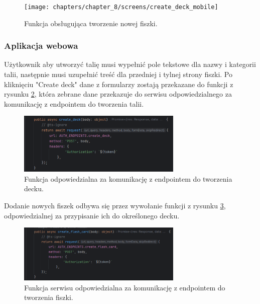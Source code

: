 \begin{figure}[H]
    \centering
    \texttt{[image: chapters/chapter\_8/screens/create\_deck\_mobile]}
    \caption{Funkcja obsługująca tworzenie nowej fiszki.}
    \label{img:create_deck_mobile}
\end{figure}

\subsubsection{Aplikacja webowa}

Użytkownik aby utworzyć talię musi wypełnić pole tekstowe dla nazwy i kategorii talii, następnie musi uzupełnić treść dla przedniej i tylnej strony fiszki. Po kliknięciu "Create deck" dane z formularzy zostają przekazane do funkcji z rysunku \ref{img:create_deck_web}, która zebrane dane przekazuje do serwisu odpowiedzialnego za komunikację z endpointem do tworzenia talii.

\begin{figure}[H]
    \centering
    \includegraphics[width=0.7\textwidth]{chapters/chapter_8/screens/create_deck_web}
    \caption{Funkcja odpowiedzialna za komunikację z endpointem do tworzenia decku.}
    \label{img:create_deck_web}
\end{figure}

Dodanie nowych fiszek odbywa się przez wywołanie funkcji z rysunku \ref{img:create_flash_card_web}, odpowiedzialnej za przypisanie ich do określonego decku.

\begin{figure}[H]
    \centering
    \includegraphics[width=0.7\textwidth]{chapters/chapter_8/screens/create_flash_card_web}
    \caption{Funkcja serwisu odpowiedzialna za komunikację z endpointem do tworzenia fiszki.}
    \label{img:create_flash_card_web}
\end{figure}

